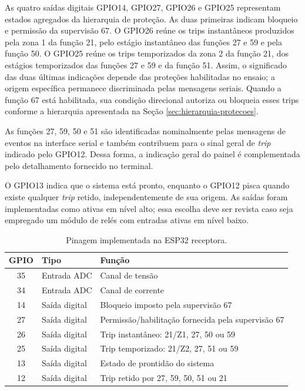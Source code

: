 As quatro saídas digitais GPIO14, GPIO27, GPIO26 e GPIO25 representam estados agregados da hierarquia de proteção. As duas primeiras indicam bloqueio e permissão da supervisão 67. O GPIO26 reúne os trips instantâneos produzidos pela zona 1 da função 21, pelo estágio instantâneo das funções 27 e 59 e pela função 50. O GPIO25 reúne os trips temporizados da zona 2 da função 21, dos estágios temporizados das funções 27 e 59 e da função 51. Assim, o significado das duas últimas indicações depende das proteções habilitadas no ensaio; a origem específica permanece discriminada pelas mensagens seriais. Quando a função 67 está habilitada, sua condição direcional autoriza ou bloqueia esses trips conforme a hierarquia apresentada na Seção \ref{sec:hierarquia-protecoes}.

As funções 27, 59, 50 e 51 são identificadas nominalmente pelas mensagens de eventos na interface serial e também contribuem para o sinal geral de \textit{trip} indicado pelo GPIO12. Dessa forma, a indicação geral do painel é complementada pelo detalhamento fornecido no terminal.

O GPIO13 indica que o sistema está pronto, enquanto o GPIO12 pisca quando existe qualquer \textit{trip} retido, independentemente de sua origem. As saídas foram implementadas como ativas em nível alto; essa escolha deve ser revista caso seja empregado um módulo de relés com entradas ativas em nível baixo.

\begin{table}[H]
  \centering
  \small
  \caption{Pinagem implementada na ESP32 receptora.}
  \label{tab:pinagem-receptora}
  \begin{tabular}{cll}
    \toprule
    GPIO & Tipo & Função \\
    \midrule
    35 & Entrada ADC & Canal de tensão \\
    34 & Entrada ADC & Canal de corrente \\
    14 & Saída digital & Bloqueio imposto pela supervisão 67 \\
    27 & Saída digital & Permissão/habilitação fornecida pela supervisão 67 \\
    26 & Saída digital & Trip instantâneo: 21/Z1, 27, 50 ou 59 \\
    25 & Saída digital & Trip temporizado: 21/Z2, 27, 51 ou 59 \\
    13 & Saída digital & Estado de prontidão do sistema \\
    12 & Saída digital & Trip retido por 27, 59, 50, 51 ou 21 \\
    \bottomrule
  \end{tabular}
\end{table}

